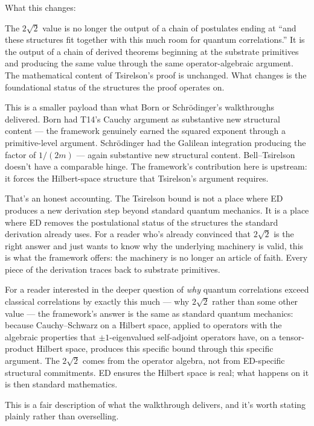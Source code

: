 \documentclass[11pt,a4paper]{article}
\begin{document}
What this changes:

The $2\sqrt{2}$ value is no longer the output of a chain of postulates ending at ``and these structures fit together with this much room for quantum correlations.'' It is the output of a chain of derived theorems beginning at the substrate primitives and producing the same value through the same operator-algebraic argument. The mathematical content of Tsirelson's proof is unchanged. What changes is the foundational status of the structures the proof operates on.

This is a smaller payload than what Born or Schr\"odinger's walkthroughs delivered. Born had T14's Cauchy argument as substantive new structural content --- the framework genuinely earned the squared exponent through a primitive-level argument. Schr\"odinger had the Galilean integration producing the factor of $1/(2m)$ --- again substantive new structural content. Bell--Tsirelson doesn't have a comparable hinge. The framework's contribution here is upstream: it forces the Hilbert-space structure that Tsirelson's argument requires.

That's an honest accounting. The Tsirelson bound is not a place where ED produces a new derivation step beyond standard quantum mechanics. It is a place where ED removes the postulational status of the structures the standard derivation already uses. For a reader who's already convinced that $2\sqrt{2}$ is the right answer and just wants to know why the underlying machinery is valid, this is what the framework offers: the machinery is no longer an article of faith. Every piece of the derivation traces back to substrate primitives.

For a reader interested in the deeper question of \emph{why} quantum correlations exceed classical correlations by exactly this much --- why $2\sqrt{2}$ rather than some other value --- the framework's answer is the same as standard quantum mechanics: because Cauchy--Schwarz on a Hilbert space, applied to operators with the algebraic properties that $\pm 1$-eigenvalued self-adjoint operators have, on a tensor-product Hilbert space, produces this specific bound through this specific argument. The $2\sqrt{2}$ comes from the operator algebra, not from ED-specific structural commitments. ED ensures the Hilbert space is real; what happens on it is then standard mathematics.

This is a fair description of what the walkthrough delivers, and it's worth stating plainly rather than overselling.
\end{document}
